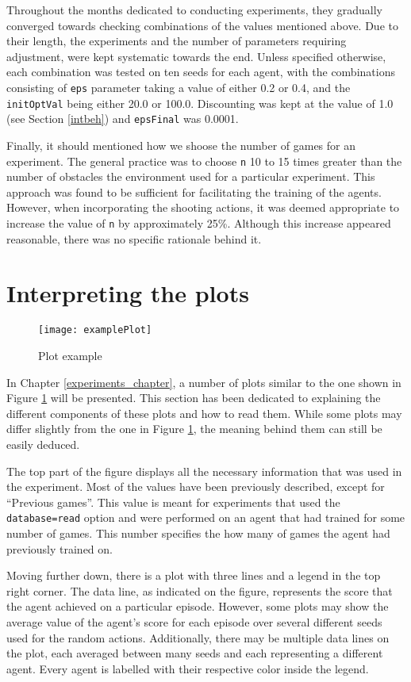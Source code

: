 Throughout the months dedicated to conducting experiments, they gradually converged towards checking combinations of the values mentioned above. Due to their length, the experiments and the number of parameters requiring adjustment, were kept systematic towards the end. Unless specified otherwise, each combination was tested on ten seeds for each agent, with the combinations consisting of \texttt{eps} parameter taking a value of either 0.2 or 0.4, and the \texttt{initOptVal} being either 20.0 or 100.0. Discounting was kept at the value of 1.0 (see Section \ref{intbeh}) and \texttt{epsFinal} was 0.0001.

Finally, it should mentioned how we shoose the number of games for an experiment. The general practice was to choose \texttt{n} 10 to 15 times greater than the number of obstacles the environment used for a particular experiment. This approach was found to be sufficient for facilitating the training of the agents. However, when incorporating the shooting actions, it was deemed appropriate to increase the value of \texttt{n} by approximately 25\%. Although this increase appeared reasonable, there was no specific rationale behind it.

\section{Interpreting the plots}
\label{plot_interpr}
\begin{figure}[h]
    \centering
    \texttt{[image: examplePlot]}
    \caption{Plot example}
    \label{fig:plt_eg}
\end{figure}

In Chapter \ref{experiments_chapter}, a number of plots similar to the one shown in Figure \ref{fig:plt_eg} will be presented. This section has been dedicated to explaining the different components of these plots and how to read them. While some plots may differ slightly from the one in Figure \ref{fig:plt_eg}, the meaning behind them can still be easily deduced.

The top part of the figure displays all the necessary information that was used in the experiment. Most of the values have been previously described, except for ``Previous games''. This value is meant for experiments that used the \texttt{database=read} option and were performed on an agent that had trained for some number of games. This number specifies the how many of games the agent had previously trained on.

Moving further down, there is a plot with three lines and a legend in the top right corner. The data line, as indicated on the figure, represents the score that the agent achieved on a particular episode. However, some plots may show the average value of the agent's score for each episode over several different seeds used for the random actions. Additionally, there may be multiple data lines on the plot, each averaged between many seeds and each representing a different agent. Every agent is labelled with their respective color inside the legend.

